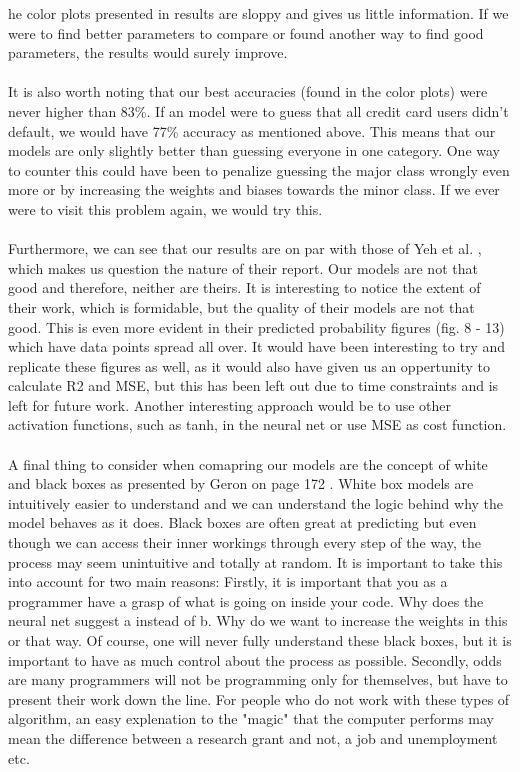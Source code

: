 \documentclass[12pt]{article}
\numberwithin{figure}{section}
\begin{document}
he color plots presented in results are sloppy and gives us little information. If we were to find better parameters to compare or found another way to find good parameters, the results would surely improve.\\ \\ 
It is also worth noting that our best accuracies (found in the color plots) were never higher than 83\%. If an model were to guess that all credit card users didn't default, we would have 77\% accuracy as mentioned above. This means that our models are only slightly better than guessing everyone in one category. One way to counter this could have been to penalize guessing the major class wrongly even more or by increasing the weights and biases towards the minor class. If we ever were to visit this problem again, we would try this. \\ \\ 
Furthermore, we can see that our results are on par with those of Yeh et al. \cite{yeh}, which makes us question the nature of their report. Our models are not that good and therefore, neither are theirs. It is interesting to notice the extent of their work, which is formidable, but the quality of their models are not that good. This is even more evident in their predicted probability figures (fig. 8 - 13) which have data points spread all over. It would have been interesting to try and replicate these figures as well, as it would also have given us an oppertunity to calculate R2 and MSE, but this has been left out due to time constraints and is left for future work. Another interesting approach would be to use other activation functions, such as tanh, in the neural net or use MSE as cost function. \\ \\
A final thing to consider when comapring our models are the concept of white and black boxes as presented by Geron on page 172 \cite{Geron}. White box models are intuitively easier to understand and we can understand the logic behind why the model behaves as it does. Black boxes are often great at predicting but even though we can access their inner workings through every step of the way, the process may seem unintuitive and totally at random. It is important to take this into account for two main reasons: Firstly, it is important that you as a programmer have a grasp of what is going on inside your code. Why does the neural net suggest a instead of b. Why do we want to increase the weights in this or that way. Of course, one will never fully understand these black boxes, but it is important to have as much control about the process as possible. Secondly, odds are many programmers will not be programming only for themselves, but have to present their work down the line. For people who do not work with these types of algorithm, an easy explenation to the "magic" that the computer performs may mean the difference between a research grant and not, a job and unemployment etc.
\end{document}
